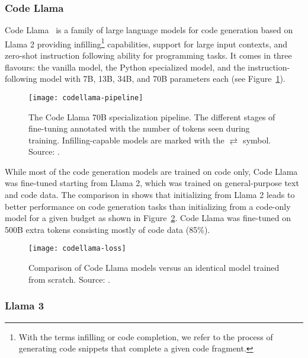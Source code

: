 \subsubsection{Code Llama}
\label{subsubsec:code-llama}

Code Llama~\cite{roziere2024codellamaopenfoundation} is a family of large language models for code generation based on Llama 2 providing infilling\footnote{With the terms infilling or code completion, we refer to the process of generating code snippets that complete a given code fragment.} capabilities, support
for large input contexts, and zero-shot instruction following ability for programming tasks.
It comes in three flavours: the vanilla model, the Python specialized model, and the instruction-following model with 7B, 13B, 34B, and 70B parameters each (see Figure~\ref{fig:code-llama}).

\begin{figure}[h!]
	\centering
	\texttt{[image: codellama-pipeline]}
	\caption{The Code Llama 70B specialization pipeline. The different stages of fine-tuning annotated with the number of tokens seen during training. Infilling-capable models are marked with the $\rightleftarrows$ symbol. Source: \protect\textcite{roziere2024codellamaopenfoundation}.}
	\label{fig:code-llama}
\end{figure}

While most of the code generation models are trained on code only, Code Llama was fine-tuned starting from Llama 2, which was trained on general-purpose text and code data.
The comparison in \textcite{roziere2024codellamaopenfoundation} shows that initializing from Llama 2 leads to better performance on code generation tasks than initializing from a code-only model for a given budget as shown in Figure~\ref{fig:code-llama-comparison}.
Code Llama was fine-tuned on 500B extra tokens consisting mostly of code data (85\%).

\begin{figure}[ht!]
	\centering
	\texttt{[image: codellama-loss]}
	\caption{Comparison of Code Llama models versus an identical model trained from scratch. Source: \protect\textcite{roziere2024codellamaopenfoundation}.}
	\label{fig:code-llama-comparison}
\end{figure}

\subsubsection{Llama 3}
\label{subsubsec:llama-3}

